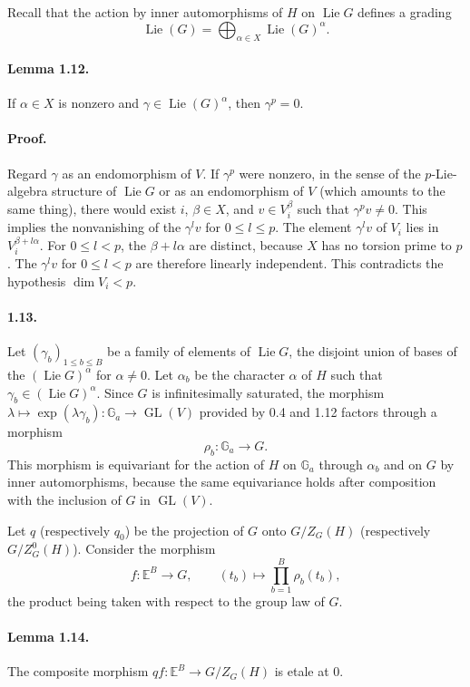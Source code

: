 \documentclass[11pt]{article}
\newcommand{\Ga}{\mathbb{G}_a}
\newcommand{\Lie}{\operatorname{Lie}}
\newcommand{\GL}{\operatorname{GL}}
\theoremstyle{plain}
\theoremstyle{definition}
\begin{document}
Recall that the action by inner automorphisms of $H$ on $\Lie G$ defines a grading
\[
   \Lie(G)=\bigoplus_{\alpha\in X}\Lie(G)^\alpha.
\]

\paragraph{Lemma 1.12.} If $\alpha\in X$ is nonzero and $\gamma\in\Lie(G)^\alpha$, then $\gamma^p=0$.

\paragraph{Proof.} Regard $\gamma$ as an endomorphism of $V$. If $\gamma^p$ were nonzero, in the sense of the $p$-Lie-algebra structure of $\Lie G$ or as an endomorphism of $V$ (which amounts to the same thing), there would exist $i$, $\beta\in X$, and $v\in V_i^\beta$ such that $\gamma^p v\ne0$. This implies the nonvanishing of the $\gamma^l v$ for $0\le l\le p$. The element $\gamma^l v$ of $V_i$ lies in $V_i^{\beta+l\alpha}$. For $0\le l<p$, the $\beta+l\alpha$ are distinct, because $X$ has no torsion prime to $p$. The $\gamma^l v$ for $0\le l<p$ are therefore linearly independent. This contradicts the hypothesis $\dim V_i<p$.

\paragraph{1.13.} Let $(\gamma_b)_{1\le b\le B}$ be a family of elements of $\Lie G$, the disjoint union of bases of the $(\Lie G)^\alpha$ for $\alpha\ne0$. Let $\alpha_b$ be the character $\alpha$ of $H$ such that $\gamma_b\in(\Lie G)^\alpha$. Since $G$ is infinitesimally saturated, the morphism $\lambda\mapsto\exp(\lambda\gamma_b):\Ga\to\GL(V)$ provided by 0.4 and 1.12 factors through a morphism
\[
   \rho_b:\Ga\longrightarrow G.
\]
This morphism is equivariant for the action of $H$ on $\Ga$ through $\alpha_b$ and on $G$ by inner automorphisms, because the same equivariance holds after composition with the inclusion of $G$ in $\GL(V)$.

Let $q$ (respectively $q_0$) be the projection of $G$ onto $G/Z_G(H)$ (respectively $G/Z^0_G(H)$). Consider the morphism
\[
   f:\mathbb E^B\longrightarrow G,
   \qquad (t_b)\longmapsto \prod_{b=1}^{B}\rho_b(t_b),
\]
the product being taken with respect to the group law of $G$.

\paragraph{Lemma 1.14.} The composite morphism $qf:\mathbb E^B\to G/Z_G(H)$ is etale at $0$.
\end{document}
